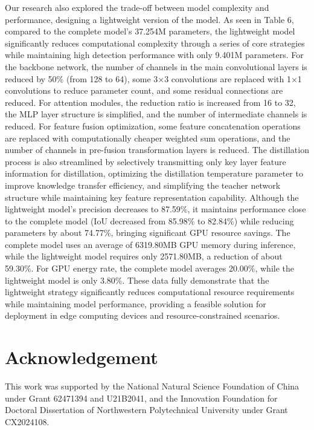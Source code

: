 \documentclass[a4paper,fleqn]{cas-dc}
\begin{document}
Our research also explored the trade-off between model complexity and performance, designing a lightweight version of the model. As seen in Table 6, compared to the complete model's 37.254M parameters, the lightweight model significantly reduces computational complexity through a series of core strategies while maintaining high detection performance with only 9.401M parameters. For the backbone network, the number of channels in the main convolutional layers is reduced by 50\% (from 128 to 64), some 3×3 convolutions are replaced with 1×1 convolutions to reduce parameter count, and some residual connections are reduced. For attention modules, the reduction ratio is increased from 16 to 32, the MLP layer structure is simplified, and the number of intermediate channels is reduced. For feature fusion optimization, some feature concatenation operations are replaced with computationally cheaper weighted sum operations, and the number of channels in pre-fusion transformation layers is reduced. The distillation process is also streamlined by selectively transmitting only key layer feature information for distillation, optimizing the distillation temperature parameter to improve knowledge transfer efficiency, and simplifying the teacher network structure while maintaining key feature representation capability. Although the lightweight model's precision decreases to 87.59\%, it maintains performance close to the complete model (IoU decreased from 85.98\% to 82.84\%) while reducing parameters by about 74.77\%, bringing significant GPU resource savings. The complete model uses an average of 6319.80MB GPU memory during inference, while the lightweight model requires only 2571.80MB, a reduction of about 59.30\%. For GPU energy rate, the complete model averages 20.00\%, while the lightweight model is only 3.80\%. These data fully demonstrate that the lightweight strategy significantly reduces computational resource requirements while maintaining model performance, providing a feasible solution for deployment in edge computing devices and resource-constrained scenarios.

\section*{Acknowledgement}
This work was supported by the National Natural Science Foundation of China under Grant 62471394 and U21B2041, and the Innovation Foundation for Doctoral Dissertation of Northwestern Polytechnical University under Grant CX2024108.

%





\end{document}
